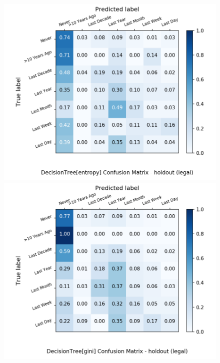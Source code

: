 \begin{figure}[H]
	\centering
	\begin{minipage}[b]{0.32\textwidth}
		\includegraphics[width=1.1\textwidth]{Plots/drugs/legal_DecisionTree_entropy_balance_False_holdout.png}
	\end{minipage}
	\begin{minipage}[b]{0.32\textwidth}
		\includegraphics[width=1.1\textwidth]{Plots/drugs/legal_DecisionTree_gini_balance_False_holdout.png}
	\end{minipage}
	\begin{minipage}[b]{0.32\textwidth}

\end{minipage}
\end{figure}

